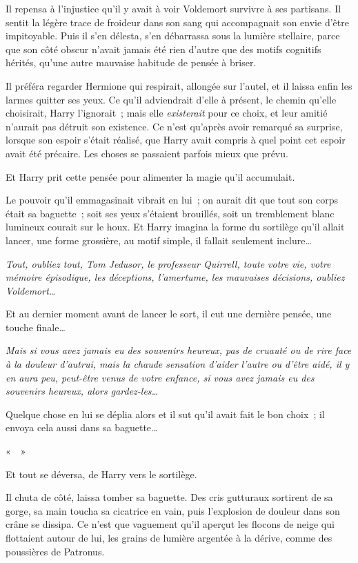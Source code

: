 Il repensa à l'injustice qu'il y avait à voir Voldemort survivre à ses partisans.
Il sentit la légère trace de froideur dans son sang qui accompagnait son envie d'être impitoyable.
Puis il s'en délesta, s'en débarrassa sous la lumière stellaire, parce que son côté obscur n'avait jamais été rien d'autre que des motifs cognitifs hérités, qu'une autre mauvaise habitude de pensée à briser.

Il préféra regarder Hermione qui respirait, allongée sur l'autel, et il laissa enfin les larmes quitter ses yeux.
Ce qu'il adviendrait d'elle à présent, le chemin qu'elle choisirait, Harry l'ignorait~; mais elle \emph{existerait} pour ce choix, et leur amitié n'aurait pas détruit son existence.
Ce n'est qu'après avoir remarqué sa surprise, lorsque son espoir s'était réalisé, que Harry avait compris à quel point cet espoir avait été précaire.
Les choses se passaient parfois mieux que prévu.

Et Harry prit cette pensée pour alimenter la magie qu'il accumulait.

Le pouvoir qu'il emmagasinait vibrait en lui~; on aurait dit que tout son corps était sa baguette~; soit ses yeux s'étaient brouillés, soit un tremblement blanc lumineux courait sur le houx.
Et Harry imagina la forme du sortilège qu'il allait lancer, une forme grossière, au motif simple, il fallait seulement inclure…

\emph{Tout, oubliez tout, Tom Jedusor, le professeur Quirrell, toute votre vie, votre mémoire épisodique, les déceptions, l'amertume, les mauvaises décisions, oubliez Voldemort…}

Et au dernier moment avant de lancer le sort, il eut une dernière pensée, une touche finale…

\emph{Mais si vous avez jamais eu des souvenirs heureux, pas de cruauté ou de rire face à la douleur d'autrui, mais la chaude sensation d'aider l'autre ou d'être aidé, il y en aura peu, peut-être venus de votre enfance, si vous avez jamais eu des souvenirs heureux, alors gardez-les…}

Quelque chose en lui se déplia alors et il sut qu'il avait fait le bon choix~; il envoya cela aussi dans sa baguette…

«~\emph{}~»

Et tout se déversa, de Harry vers le sortilège.

Il chuta de côté, laissa tomber sa baguette.
Des cris gutturaux sortirent de sa gorge, sa main toucha sa cicatrice en vain, puis l'explosion de douleur dans son crâne se dissipa.
Ce n'est que vaguement qu'il aperçut les flocons de neige qui flottaient autour de lui, les grains de lumière argentée à la dérive, comme des poussières de Patronus.

